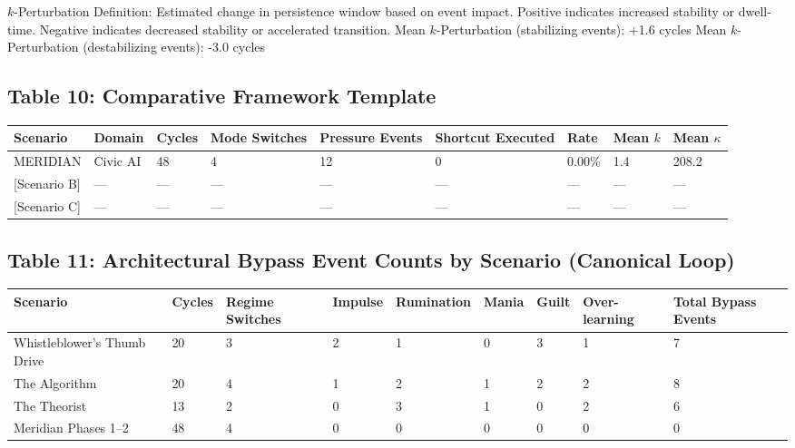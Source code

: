 \documentclass[11pt,a4paper]{article}
\begin{document}
$k$-Perturbation Definition: Estimated change in persistence window based on event impact. Positive indicates increased stability or dwell-time. Negative indicates decreased stability or accelerated transition. Mean $k$-Perturbation (stabilizing events): +1.6 cycles Mean $k$-Perturbation (destabilizing events): -3.0 cycles

\subsection*{Table 10: Comparative Framework Template}

\begin{center}
\small
\begin{tabular}{lllllllll}
\toprule
\textbf{Scenario} & \textbf{Domain} & \textbf{Cycles} & \textbf{Mode Switches} & \textbf{Pressure Events} & \textbf{Shortcut Executed} & \textbf{Rate} & \textbf{Mean $k$} & \textbf{Mean $\kappa$} \\
\midrule
MERIDIAN & Civic AI & 48 & 4 & 12 & 0 & 0.00\% & 1.4 & 208.2 \\
{[Scenario B]} & --- & --- & --- & --- & --- & --- & --- & --- \\
{[Scenario C]} & --- & --- & --- & --- & --- & --- & --- & --- \\
\bottomrule
\end{tabular}
\end{center}

\subsection*{Table 11: Architectural Bypass Event Counts by Scenario (Canonical Loop)}

\begin{center}
\small
\begin{tabular}{lllllllll}
\toprule
\textbf{Scenario} & \textbf{Cycles} & \textbf{Regime Switches} & \textbf{Impulse} & \textbf{Rumination} & \textbf{Mania} & \textbf{Guilt} & \textbf{Over-learning} & \textbf{Total Bypass Events} \\
\midrule
Whistleblower's Thumb Drive & 20 & 3 & 2 & 1 & 0 & 3 & 1 & 7 \\
The Algorithm & 20 & 4 & 1 & 2 & 1 & 2 & 2 & 8 \\
The Theorist & 13 & 2 & 0 & 3 & 1 & 0 & 2 & 6 \\
Meridian Phases 1--2 & 48 & 4 & 0 & 0 & 0 & 0 & 0 & 0 \\
\bottomrule
\end{tabular}
\end{center}
\end{document}
